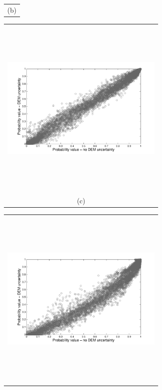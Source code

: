 \documentclass[12pt]{article}
\newcommand{\Pic}[2][0.85]{\begin{center}\texttt{[image: \#2]}
 \end{center} }
\begin{document}
\begin{figure}[H]
\begin{minipage}{0.6\textwidth}
\begin{tabular}{c}
        (b)
        \end{tabular}
    \end{minipage} 
    \begin{minipage}[b]{0.6\textwidth}
        \begin{tabular}{c}
       \includegraphics[width=8cm,height=9cm,keepaspectratio]{figs_pdf/Mammoth_Topsar_vs_meth0.pdf}\\
        (c)
        \end{tabular}
    \end{minipage}
    \begin{minipage}{0.6\textwidth}
        \begin{tabular}{c}
	\includegraphics[width=8cm,height=9cm,keepaspectratio]{figs_pdf/Mammoth_Topsar_vs_meth3.pdf}\\

\end{tabular}
\end{minipage}
\end{figure}
\end{document}
